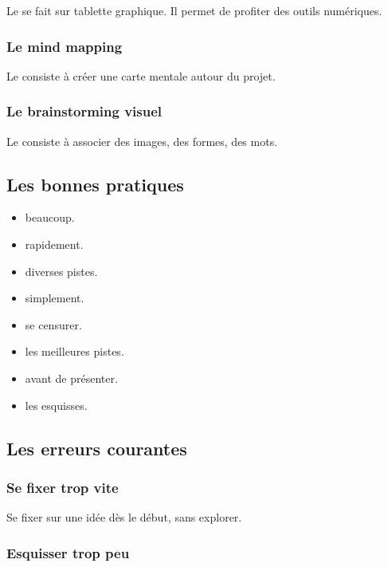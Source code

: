 Le  se fait sur tablette graphique. Il permet de profiter des outils numériques.

\subsubsection{Le mind mapping}

Le  consiste à créer une carte mentale autour du projet.

\subsubsection{Le brainstorming visuel}

Le  consiste à associer des images, des formes, des mots.

\subsection{Les bonnes pratiques}

\begin{itemize}
    \item {} beaucoup.
    \item {} rapidement.
    \item {} diverses pistes.
    \item {} simplement.
    \item {} se censurer.
    \item {} les meilleures pistes.
    \item {} avant de présenter.
    \item {} les esquisses.
\end{itemize}

\subsection{Les erreurs courantes}

\subsubsection{Se fixer trop vite}

Se fixer sur une idée dès le début, sans explorer.

\subsubsection{Esquisser trop peu}

